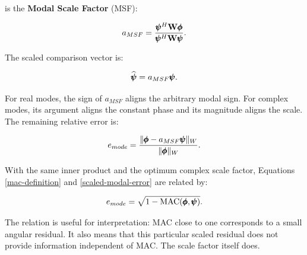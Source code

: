 is the \textbf{Modal Scale Factor} (MSF):

\begin{bbox}
    \begin{equation}\label{modal-scale-factor}
        a_{MSF}=
        \frac{\pmb{\psi}^{H}\mathbf{W}\pmb{\phi}}
             {\pmb{\psi}^{H}\mathbf{W}\pmb{\psi}}.
    \end{equation}
\end{bbox}

The scaled comparison vector is:

\begin{equation}
    \widehat{\pmb{\psi}}=a_{MSF}\pmb{\psi}.
\end{equation}

For real modes, the sign of $a_{MSF}$ aligns the arbitrary modal sign. For
complex modes, its argument aligns the constant phase and its magnitude aligns
the scale. The remaining relative error is:

\begin{equation}\label{scaled-modal-error}
    e_{mode}=
    \frac{\| {\pmb{\phi}-a_{MSF}\pmb{\psi}} \|_{W}}
         {\| {\pmb{\phi}} \|_{W}}.
\end{equation}

With the same inner product and the optimum complex scale factor, Equations
\eqref{mac-definition} and \eqref{scaled-modal-error} are related by:

\begin{equation}\label{mac-residual-relation}
    e_{mode}=\sqrt{1-\operatorname{MAC}(\pmb{\phi},\pmb{\psi})}.
\end{equation}

The relation is useful for interpretation: MAC close to one corresponds to a
small angular residual. It also means that this particular scaled residual does
not provide information independent of MAC. The scale factor itself does.

